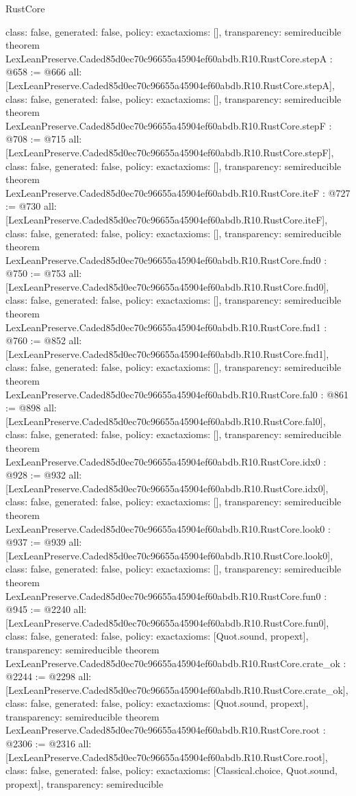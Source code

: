 \begin{lexlean}{RustCore}
\begin{coremodule}
{  class: false,
  generated: false,
  policy: exact{axioms: []},
  transparency: semireducible
}
theorem LexLeanPreserve.Caded85d0ec70c96655a45904ef60abdb.R10.RustCore.stepA : @658 := @666 {
  all: [LexLeanPreserve.Caded85d0ec70c96655a45904ef60abdb.R10.RustCore.stepA],
  class: false,
  generated: false,
  policy: exact{axioms: []},
  transparency: semireducible
}
theorem LexLeanPreserve.Caded85d0ec70c96655a45904ef60abdb.R10.RustCore.stepF : @708 := @715 {
  all: [LexLeanPreserve.Caded85d0ec70c96655a45904ef60abdb.R10.RustCore.stepF],
  class: false,
  generated: false,
  policy: exact{axioms: []},
  transparency: semireducible
}
theorem LexLeanPreserve.Caded85d0ec70c96655a45904ef60abdb.R10.RustCore.iteF : @727 := @730 {
  all: [LexLeanPreserve.Caded85d0ec70c96655a45904ef60abdb.R10.RustCore.iteF],
  class: false,
  generated: false,
  policy: exact{axioms: []},
  transparency: semireducible
}
theorem LexLeanPreserve.Caded85d0ec70c96655a45904ef60abdb.R10.RustCore.fnd0 : @750 := @753 {
  all: [LexLeanPreserve.Caded85d0ec70c96655a45904ef60abdb.R10.RustCore.fnd0],
  class: false,
  generated: false,
  policy: exact{axioms: []},
  transparency: semireducible
}
theorem LexLeanPreserve.Caded85d0ec70c96655a45904ef60abdb.R10.RustCore.fnd1 : @760 := @852 {
  all: [LexLeanPreserve.Caded85d0ec70c96655a45904ef60abdb.R10.RustCore.fnd1],
  class: false,
  generated: false,
  policy: exact{axioms: []},
  transparency: semireducible
}
theorem LexLeanPreserve.Caded85d0ec70c96655a45904ef60abdb.R10.RustCore.fal0 : @861 := @898 {
  all: [LexLeanPreserve.Caded85d0ec70c96655a45904ef60abdb.R10.RustCore.fal0],
  class: false,
  generated: false,
  policy: exact{axioms: []},
  transparency: semireducible
}
theorem LexLeanPreserve.Caded85d0ec70c96655a45904ef60abdb.R10.RustCore.idx0 : @928 := @932 {
  all: [LexLeanPreserve.Caded85d0ec70c96655a45904ef60abdb.R10.RustCore.idx0],
  class: false,
  generated: false,
  policy: exact{axioms: []},
  transparency: semireducible
}
theorem LexLeanPreserve.Caded85d0ec70c96655a45904ef60abdb.R10.RustCore.look0 : @937 := @939 {
  all: [LexLeanPreserve.Caded85d0ec70c96655a45904ef60abdb.R10.RustCore.look0],
  class: false,
  generated: false,
  policy: exact{axioms: []},
  transparency: semireducible
}
theorem LexLeanPreserve.Caded85d0ec70c96655a45904ef60abdb.R10.RustCore.fun0 : @945 := @2240 {
  all: [LexLeanPreserve.Caded85d0ec70c96655a45904ef60abdb.R10.RustCore.fun0],
  class: false,
  generated: false,
  policy: exact{axioms: [Quot.sound, propext]},
  transparency: semireducible
}
theorem LexLeanPreserve.Caded85d0ec70c96655a45904ef60abdb.R10.RustCore.crate_ok : @2244 := @2298 {
  all: [LexLeanPreserve.Caded85d0ec70c96655a45904ef60abdb.R10.RustCore.crate_ok],
  class: false,
  generated: false,
  policy: exact{axioms: [Quot.sound, propext]},
  transparency: semireducible
}
theorem LexLeanPreserve.Caded85d0ec70c96655a45904ef60abdb.R10.RustCore.root : @2306 := @2316 {
  all: [LexLeanPreserve.Caded85d0ec70c96655a45904ef60abdb.R10.RustCore.root],
  class: false,
  generated: false,
  policy: exact{axioms: [Classical.choice, Quot.sound, propext]},
  transparency: semireducible
}


\end{coremodule}
\end{lexlean}
